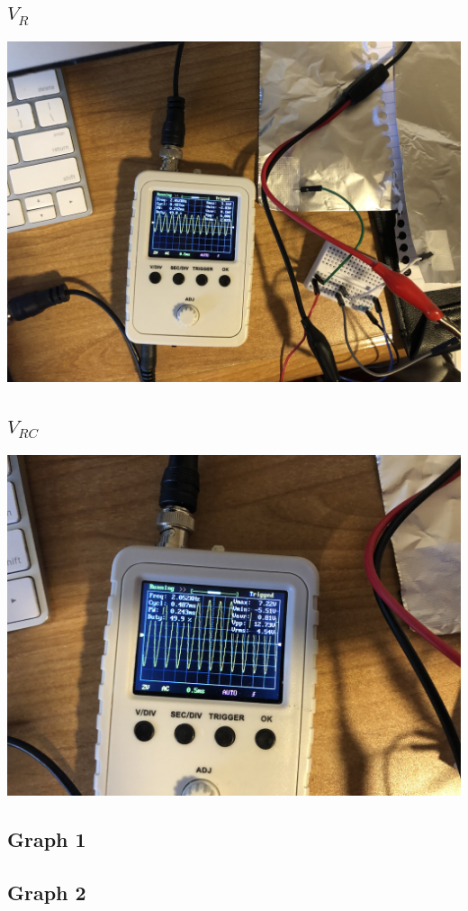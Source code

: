 \documentclass{article}
\begin{document}
\begin{center}
  \subsection*{\(V_R\)}
  \includegraphics[scale=0.1]{2.jpeg}
  \subsection*{\(V_{RC}\)}
  \includegraphics[scale=0.1]{1.jpeg}
\end{center}

\newpage
\begin{center}
  \subsection*{Graph 1}
  \subsection*{Graph 2}
\end{center}
\end{document}
